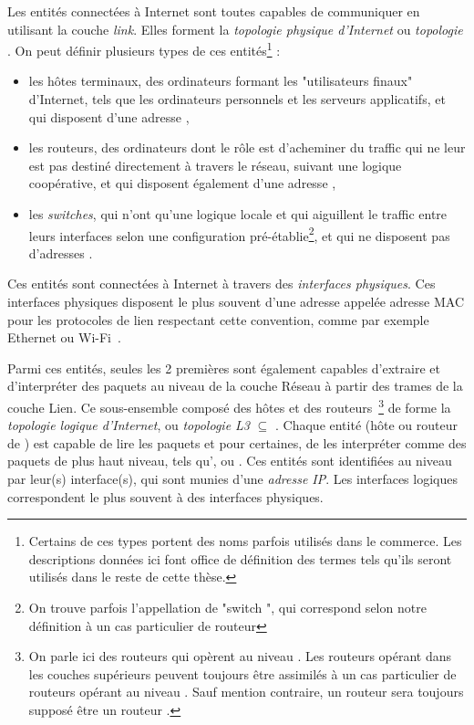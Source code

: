 Les entités connectées à Internet sont toutes capables de communiquer en
utilisant la couche {\em link}. Elles forment la {\em topologie physique
d'Internet} ou {\em topologie \LL}. On peut définir plusieurs types de ces
entités\footnote{Certains de ces types portent des noms parfois utilisés dans le commerce. Les
descriptions données ici font office de définition des termes tels qu'ils
seront utilisés dans le reste de cette thèse.} :
\begin{itemize}
  \item les hôtes terminaux, des ordinateurs formant les "utilisateurs finaux"
  d'Internet, tels que les ordinateurs personnels et les serveurs applicatifs, et qui
  disposent d'une adresse \ip,
  \item les routeurs, des ordinateurs dont le rôle est d'acheminer du traffic
  qui ne leur est pas destiné directement à travers le réseau, suivant une
  logique coopérative, et qui disposent également d'une adresse \ip,
  \item les {\em switches}, qui n'ont qu'une logique locale et qui aiguillent le
  traffic entre leurs interfaces selon une configuration
  pré-établie\footnote{On trouve parfois l'appellation de "switch \LLL", qui
  correspond selon notre définition à un cas particulier de routeur}, et qui ne
  disposent pas d'adresses \ip.
\end{itemize}
Ces entités sont connectées à Internet à travers des {\em interfaces physiques}.
Ces interfaces physiques disposent le plus souvent d'une adresse appelée adresse
MAC pour les protocoles de lien respectant cette convention, comme par exemple
Ethernet ou Wi-Fi~\cite{ieee802}.

Parmi ces entités, seules les 2 premières sont également capables d'extraire et
d'interpréter des paquets \ip au niveau de la couche Réseau à partir des trames
de la couche Lien.
Ce sous-ensemble composé des hôtes et des routeurs~\footnote{On parle ici des
routeurs qui opèrent au niveau \LLL. Les routeurs opérant dans les couches
supérieurs peuvent toujours être assimilés à un cas particulier de routeurs
opérant au niveau \LLL. Sauf mention contraire, un routeur sera toujours supposé
être un routeur \LLL.} de \LL forme la {\em topologie logique d'Internet}, ou
{\em topologie L3} $\subseteq$ \LL.
Chaque entité (hôte ou routeur de \LLL) est capable de lire les paquets \ip et
pour certaines, de les interpréter comme des paquets de plus haut niveau, tels
qu'\icmp, \tcp ou \udp.
Ces entités sont identifiées au niveau \LLL par leur(s) interface(s), qui sont
munies d'une {\em adresse IP}. Les interfaces logiques correspondent le plus
souvent à des interfaces physiques.

